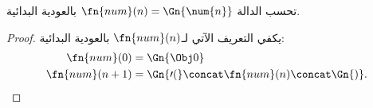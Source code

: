 \documentclass[../../../include/open-logic-section]{subfiles}
\begin{document}
\begin{prop}
  تحسب الدالة $\fn{num}(n)=\Gn{\num{n}}$ بالعودية البدائية.
\end{prop}

\begin{proof}
  يكفي التعريف الآتي لـ$\fn{num}(n)$ بالعودية البدائية:
  \begin{align*}
    \fn{num}(0) & = \Gn{\Obj 0}\\
    \fn{num}(n+1) & = \Gn{\prime(} \concat \fn{num}(n) \concat \Gn{)}.
  \end{align*}
\end{proof}
\end{document}
